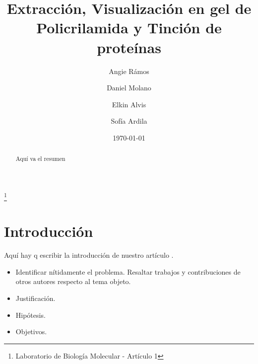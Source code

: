 \documentclass[%
 reprint,
 amsmath,amssymb,
 aps,
showkeys
]{revtex4-1}
\begin{document}

\title{Extracción, Visualización en gel de Policrilamida y Tinción de proteínas }%
\thanks{Laboratorio de Biología Molecular - Artículo 1}%

\author{Angie Rámos}
\author{Daniel Molano}%
\author{Elkin Alvis}
\author{Sof\'ia Ardila}

%


\date[Fecha: ]{\today}%

\begin{abstract}
Aquí va el resumen
\end{abstract}

\maketitle


\section{\label{sec:Intro}Introducción}
	Aquí hay q escribir la introducción de nuestro artículo \citep{Alfonso2010a}. \\
	
	\begin{itemize}
		\item Identificar nítidamente el problema.
		\subitem Resaltar trabajos y contribuciones de otros autores respecto al tema objeto.
		\item Justificación.
		\item Hipótesis. 
		\item Objetivos.
	\end{itemize}
	
\end{document}
